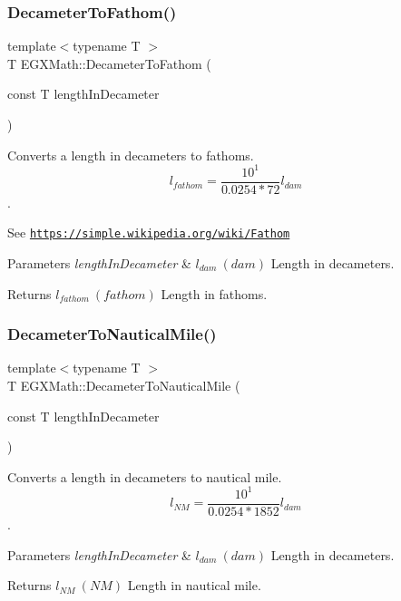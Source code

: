 \subsubsection{\texorpdfstring{Decameter\+To\+Fathom()}{DecameterToFathom()}}
{\footnotesize\ttfamily template$<$typename T $>$ \\
T E\+G\+X\+Math\+::\+Decameter\+To\+Fathom (\begin{DoxyParamCaption}\item[{const T}]{length\+In\+Decameter }\end{DoxyParamCaption})}



Converts a length in decameters to fathoms. \[ l_{fathom}= \frac{10^{1}}{0.0254 * 72} l_{dam} \]. 

See \href{https://simple.wikipedia.org/wiki/Fathom}{\tt https\+://simple.\+wikipedia.\+org/wiki/\+Fathom} 
\begin{DoxyParams}{Parameters}
{\em length\+In\+Decameter} & $ l_{dam}\ (dam)$ Length in decameters. \\
\hline
\end{DoxyParams}
\begin{DoxyReturn}{Returns}
$ l_{fathom}\ (fathom)$ Length in fathoms. 
\end{DoxyReturn}
\mbox{\label{group___e_g_x_math-_conversions-_length_conversions-_s_i-_decameter-_nautical_ga099c662953d7c82d538755bd699993b1}} 
\subsubsection{\texorpdfstring{Decameter\+To\+Nautical\+Mile()}{DecameterToNauticalMile()}}
{\footnotesize\ttfamily template$<$typename T $>$ \\
T E\+G\+X\+Math\+::\+Decameter\+To\+Nautical\+Mile (\begin{DoxyParamCaption}\item[{const T}]{length\+In\+Decameter }\end{DoxyParamCaption})}



Converts a length in decameters to nautical mile. \[ l_{NM}= \frac{10^{1}}{0.0254 * 1852} l_{dam} \]. 


\begin{DoxyParams}{Parameters}
{\em length\+In\+Decameter} & $ l_{dam}\ (dam)$ Length in decameters. \\
\hline
\end{DoxyParams}
\begin{DoxyReturn}{Returns}
$ l_{NM}\ (NM)$ Length in nautical mile. 
\end{DoxyReturn}
